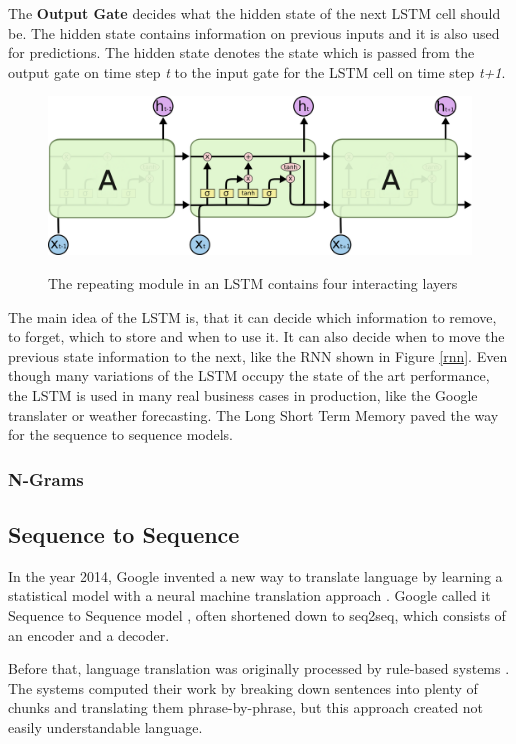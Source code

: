 The \textbf{Output Gate} decides what the hidden state of the next LSTM cell should be. The hidden state contains information on previous inputs and it is also used for predictions. The hidden state denotes the state which is passed from the output gate on time step \textit{t} to the input gate for the LSTM cell on time step \textit{t+1}.


\begin{figure}
	\begin{center}
		\includegraphics[width=4.5in]{photos/LSTM3-chain}\\
		\caption{The repeating module in an LSTM contains four interacting layers \cite{olah}}\label{lstm2}
	\end{center}
\end{figure}

The main idea of the LSTM is, that it can decide which information to remove, to forget, which to store and when to use it. It can also decide when to move the previous state information to the next, like the RNN shown in Figure \ref{rnn}. Even though many variations of the LSTM occupy the state of the art performance, the LSTM is used in many real business cases in production, like the Google translater or weather forecasting.
The Long Short Term Memory paved the way for the sequence to sequence models.
\subsubsection{N-Grams}\label{ss:ngram}

\subsection{Sequence to Sequence}
In the year 2014, Google invented a new way to translate language by learning a statistical model with a neural machine translation approach \cite{seq2seq}. Google called it Sequence to Sequence model \cite{seq2seq}, often shortened down to seq2seq, which consists of an encoder and a decoder. 

Before that, language translation was originally processed by rule-based systems \cite{chen-goodman}. The systems computed their work by breaking down sentences into plenty of chunks and translating them phrase-by-phrase, but this approach created not easily understandable language.

